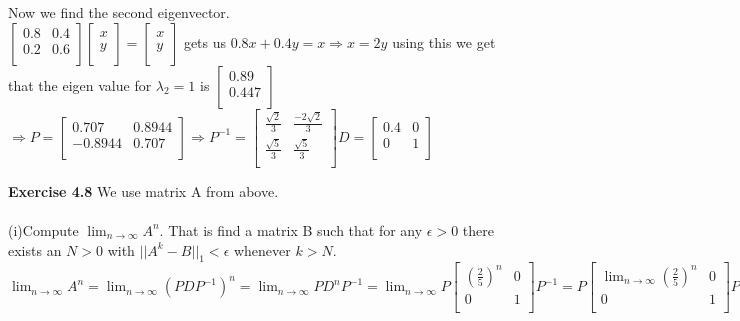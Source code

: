 \documentclass[letterpaper,12pt]{article}
\theoremstyle{definition}
\begin{document}
Now we find the second eigenvector.\\
$\begin{bmatrix}
   0.8 & 0.4 \\
   0.2 & 0.6 \\
  \end{bmatrix} 
  \begin{bmatrix}
   x\\
   y\\
  \end{bmatrix} =
  \begin{bmatrix}
   x\\
   y\\
  \end{bmatrix} $
gets us $0.8x + 0.4y = x \Rightarrow x=2y$ using this we get that the eigen value for $\lambda_2 = 1$ is  $\begin{bmatrix}
   0.89\\
   0.447\\
  \end{bmatrix} $
$ \Rightarrow P = \begin{bmatrix}
   0.707  &  0.8944 \\
   -0.8944  &  0.707 \\
  \end{bmatrix} 
  \Rightarrow P^{-1} = \begin{bmatrix}
   \frac{\sqrt{2}}{3}  &  \frac{-2\sqrt{2}}{3} \\
   \frac{\sqrt{5}}{3}  &  \frac{\sqrt{5}}{3} \\
  \end{bmatrix} 
  D = \begin{bmatrix}
   0.4  & 0\\
   0  &  1 \\
  \end{bmatrix}$
  
  



\textbf{Exercise 4.8}
We use matrix A from above.\\
\\
(i)Compute $\displaystyle\lim_{n \to \infty} A^n$. That is find a matrix B such that for any $\epsilon > 0$ there exists an $N>0$ with $||A^k - B||_{1}< \epsilon$ whenever $k>N$. \\

$\displaystyle\lim_{n \to \infty}A^n = \displaystyle\lim_{n \to \infty}(PDP^{-1})^n = \displaystyle\lim_{n \to \infty}PD^nP^{-1} = \displaystyle\lim_{n \to \infty}P\begin{bmatrix}
   (\frac{2}{5})^n  & 0\\
   0  &  1 \\
  \end{bmatrix} P^{-1} = P\begin{bmatrix}
    \displaystyle\lim_{n \to \infty}(\frac{2}{5})^n  & 0\\
   0  &  1 \\
  \end{bmatrix}P^{-1} =P
  \begin{bmatrix}
   0  & 0\\
   0  &  1 \\
  \end{bmatrix}P^{-1} = B$\\
  
\end{document}
